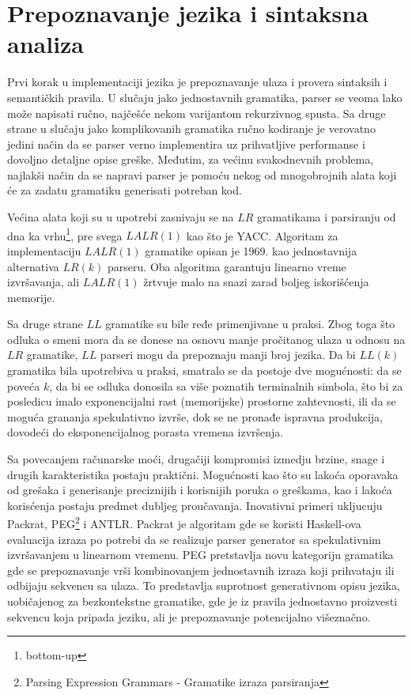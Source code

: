 \chapter{Prepoznavanje jezika i sintaksna analiza}
\label{ch:prepoznavanje}

Prvi korak u implementaciji jezika je prepoznavanje ulaza i provera sintaksih i semantičkih pravila. 
U slučaju jako jednostavnih gramatika, parser se veoma lako može napisati ručno, najčešće nekom varijantom rekurzivnog spusta. 
Sa druge strane u slučaju jako komplikovanih gramatika ručno kodiranje je verovatno jedini način da se parser verno implementira uz prihvatljive performanse i dovoljno detaljne opise greške.
Međutim, za većinu svakodnevnih problema, najlakši način da se napravi parser je pomoću nekog od mnogobrojnih alata koji će za zadatu gramatiku generisati potreban kod. 

Većina alata koji su u upotrebi zasnivaju se na $LR$\cite{lr} gramatikama i parsiranju od dna ka vrhu\footnote{\eng bottom-up}, pre svega $LALR(1)$ kao što je YACC\cite{yacc}.
Algoritam za implementaciju $LALR(1)$ gramatike opisan je 1969. kao jednostavnija alternativa $LR(k)$ parseru.
Oba algoritma garantuju linearno vreme izvršavanja, ali $LALR(1)$ žrtvuje malo na snazi zarad boljeg iskorišćenja memorije.

Sa druge strane $LL$ gramatike su bile ređe primenjivane u praksi.
Zbog toga što odluka o smeni mora da se donese na osnovu manje pročitanog ulaza u odnosu na $LR$ gramatike, $LL$ parseri mogu da prepoznaju manji broj jezika.
Da bi $LL(k)$ gramatika bila upotrebiva u praksi, smatralo se da postoje dve mogućnosti: da se poveća $k$, da bi se odluka donosila sa više poznatih terminalnih simbola, što bi za posledicu imalo exponencijalni rast (memorijske) prostorne zahtevnosti, ili da se moguća grananja spekulativno izvrše, dok se ne pronađe ispravna produkcija, dovodeći do eksponencijalnog porasta vremena izvršenja.

Sa povecanjem računarske moći, drugačiji kompromisi izmedju brzine, snage i drugih karakteristika postaju praktični.
Mogućnosti kao što su lakoća oporavaka od grešaka i generisanje preciznijih i korisnijih poruka o greškama, kao i lakoća korisćenja postaju predmet dubljeg proučavanja.
Inovativni primeri ukljucuju Packrat\cite{packrat}, PEG\cite{peg}\footnote{\skr \eng Parsing Expression Grammars - Gramatike izraza parsiranja} i ANTLR.
Packrat je algoritam gde se koristi Haskell-ova evaluacija izraza po potrebi da se realizuje parser generator sa spekulativnim izvršavanjem u linearnom vremenu.
PEG pretstavlja novu kategoriju gramatika gde se prepoznavanje vrši kombinovanjem jednostavnih izraza koji prihvataju ili odbijaju sekvencu sa ulaza.
To predstavlja suprotnost generativnom opisu jezika, uobičajenog za bezkontekstne gramatike, gde je iz pravila jednostavno proizvesti sekvencu koja pripada jeziku, ali je prepoznavanje potencijalno višeznačno.

